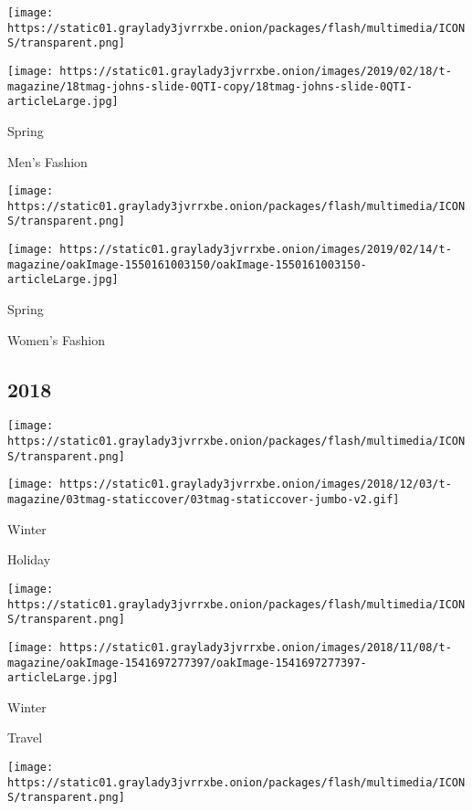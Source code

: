 \texttt{[image: https://static01.graylady3jvrrxbe.onion/packages/flash/multimedia/ICONS/transparent.png]}

\texttt{[image: https://static01.graylady3jvrrxbe.onion/images/2019/02/18/t-magazine/18tmag-johns-slide-0QTI-copy/18tmag-johns-slide-0QTI-articleLarge.jpg]}

Spring

Men's Fashion

\href{https://www.nytimes3xbfgragh.onion/issue/t-magazine/2019/02/04/ts-feb-17-womens-fashion-issue}{}

\texttt{[image: https://static01.graylady3jvrrxbe.onion/packages/flash/multimedia/ICONS/transparent.png]}

\texttt{[image: https://static01.graylady3jvrrxbe.onion/images/2019/02/14/t-magazine/oakImage-1550161003150/oakImage-1550161003150-articleLarge.jpg]}

Spring

Women's Fashion

\hypertarget{2018}{%
\subsection{2018}\label{2018}}

\href{https://www.nytimes3xbfgragh.onion/issue/t-magazine/2018/11/19/ts-dec-2-holiday-issue}{}

\texttt{[image: https://static01.graylady3jvrrxbe.onion/packages/flash/multimedia/ICONS/transparent.png]}

\texttt{[image: https://static01.graylady3jvrrxbe.onion/images/2018/12/03/t-magazine/03tmag-staticcover/03tmag-staticcover-jumbo-v2.gif]}

Winter

Holiday

\href{https://www.nytimes3xbfgragh.onion/issue/t-magazine/2018/10/26/ts-nov-11-travel-issue}{}

\texttt{[image: https://static01.graylady3jvrrxbe.onion/packages/flash/multimedia/ICONS/transparent.png]}

\texttt{[image: https://static01.graylady3jvrrxbe.onion/images/2018/11/08/t-magazine/oakImage-1541697277397/oakImage-1541697277397-articleLarge.jpg]}

Winter

Travel

\href{https://www.nytimes3xbfgragh.onion/issue/t-magazine/2018/10/05/ts-oct-21-greats-issue}{}

\texttt{[image: https://static01.graylady3jvrrxbe.onion/packages/flash/multimedia/ICONS/transparent.png]}

